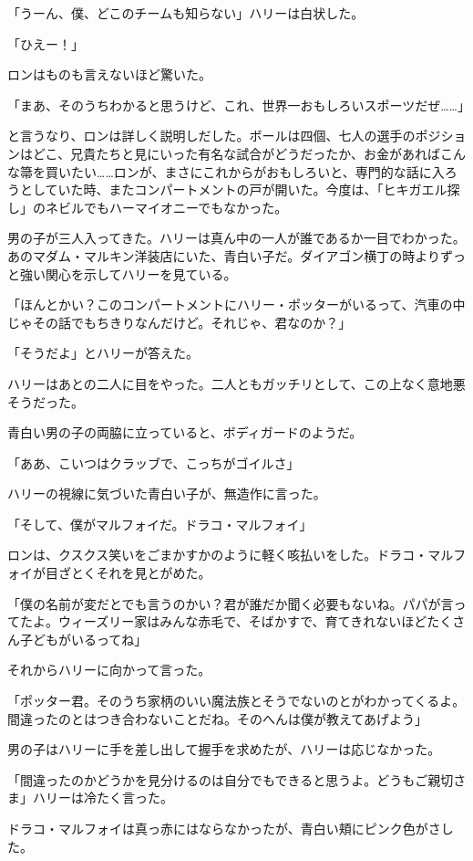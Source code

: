 \documentclass[10pt,a4paper]{article}
\begin{document}
\begin{CJK}{UTF8}{min}
「うーん、僕、どこのチームも知らない」ハリーは白状した。

「ひえー！」

ロンはものも言えないほど驚いた。

「まあ、そのうちわかると思うけど、これ、世界一おもしろいスポーツだぜ……」

と言うなり、ロンは詳しく説明しだした。ボールは四個、七人の選手のポジションはどこ、兄貴たちと見にいった有名な試合がどうだったか、お金があればこんな箒を買いたい……ロンが、まさにこれからがおもしろいと、専門的な話に入ろうとしていた時、またコンパートメントの戸が開いた。今度は、「ヒキガエル探し」のネビルでもハーマイオニーでもなかった。

男の子が三人入ってきた。ハリーは真ん中の一人が誰であるか一目でわかった。あのマダム・マルキン洋装店にいた、青白い子だ。ダイアゴン横丁の時よりずっと強い関心を示してハリーを見ている。

「ほんとかい？このコンパートメントにハリー・ポッターがいるって、汽車の中じゃその話でもちきりなんだけど。それじゃ、君なのか？」

「そうだよ」とハリーが答えた。

ハリーはあとの二人に目をやった。二人ともガッチリとして、この上なく意地悪そうだった。

青白い男の子の両脇に立っていると、ボディガードのようだ。

「ああ、こいつはクラッブで、こっちがゴイルさ」

ハリーの視線に気づいた青白い子が、無造作に言った。

「そして、僕がマルフォイだ。ドラコ・マルフォイ」

ロンは、クスクス笑いをごまかすかのように軽く咳払いをした。ドラコ・マルフォイが目ざとくそれを見とがめた。

「僕の名前が変だとでも言うのかい？君が誰だか聞く必要もないね。パパが言ってたよ。ウィーズリー家はみんな赤毛で、そばかすで、育てきれないほどたくさん子どもがいるってね」

それからハリーに向かって言った。

「ポッター君。そのうち家柄のいい魔法族とそうでないのとがわかってくるよ。間違ったのとはつき合わないことだね。そのへんは僕が教えてあげよう」

男の子はハリーに手を差し出して握手を求めたが、ハリーは応じなかった。

「間違ったのかどうかを見分けるのは自分でもできると思うよ。どうもご親切さま」ハリーは冷たく言った。

ドラコ・マルフォイは真っ赤にはならなかったが、青白い頬にピンク色がさした。


\end{CJK}
\end{document}
